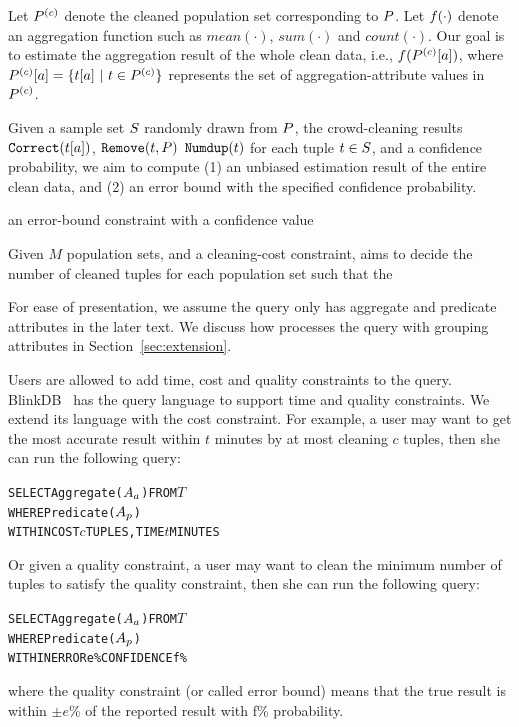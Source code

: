 Let $P^{(c)}$ denote the cleaned population set corresponding to $P$. Let $f(\cdot)$ denote an aggregation function such as $mean(\cdot)$, $sum(\cdot)$ and $count(\cdot)$. Our goal is to estimate the aggregation result of the whole clean data, i.e., $f(P^{(c)}[a])$, where $P^{(c)}[a] = \{t[a]~|~t\in P^{(c)}\}$ represents the set of aggregation-attribute values in $P^{(c)}$.

\begin{definition}
Given a sample set $S$ randomly drawn from $P$, the crowd-cleaning results $\texttt{Correct}(t[a])$, $\texttt{Remove}(t, P)$
$\texttt{Numdup}(t)$ for each tuple $t\in S$, and a confidence probability, we aim to compute (1) an unbiased estimation result of the entire clean data, and (2) an error bound with the specified confidence probability.
\end{definition}







an error-bound constraint with a confidence value

\begin{definition}
Given $M$ population sets, and a cleaning-cost constraint, \projx aims to decide the number of cleaned tuples for each population set such that the 
\end{definition}


For ease of presentation, we assume the query only has aggregate and predicate attributes in the later text. We discuss how \projx processes the query with grouping attributes in Section~\ref{sec:extension}. 


Users are allowed to add time, cost and quality constraints to the query. BlinkDB~\cite{??} has the query language to support time and quality constraints. We extend its language with the cost constraint. For example, a user may want to get the most accurate result within $t$ minutes by at most cleaning $c$ tuples, then she can run the following query:
\begin{alltt}
SELECT Aggregate(\(A\sb{a}\)) FROM \(T\)
WHERE Predicate(\(A\sb{p}\))
WITHIN COST \(c\) TUPLES, TIME \(t\) MINUTES
\end{alltt}
Or given a quality constraint, a user may want to clean the minimum number of tuples to satisfy the quality constraint, then she can run the following query:
\begin{alltt}
SELECT Aggregate(\(A\sb{a}\)) FROM \(T\)
WHERE Predicate(\(A\sb{p}\))
WITHIN ERROR e\% CONFIDENCE f\% 
\end{alltt}
where the quality constraint (or called error bound) means that the true result is within $\pm e$\% of the reported result with f\% probability. 


